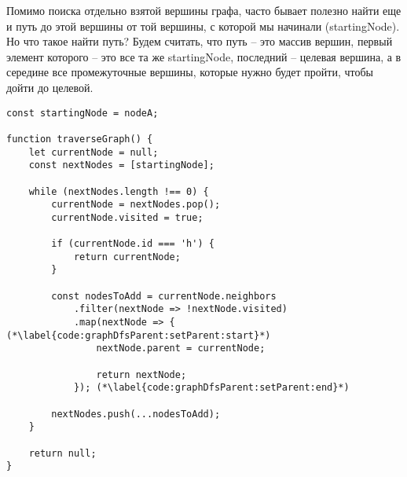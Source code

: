 \documentclass[../../article.tex]{subfiles}
\begin{document}
Помимо поиска отдельно взятой вершины графа, часто бывает полезно найти еще и путь до этой вершины от той вершины, с которой мы начинали ({\firacodebold startingNode}). Но что такое найти путь? Будем считать, что путь – это массив вершин, первый элемент которого – это все та же {\firacodebold startingNode}, последний – целевая вершина, а в середине все промежуточные вершины, которые нужно будет пройти, чтобы дойти до целевой.

\begin{figure*}
    \begin{ruledelement}
        \begin{lstlisting}[caption={Обход графа в глубину и формирование обратного дерева обхода}, label={lst:graphDfsParent}]
const startingNode = nodeA;

function traverseGraph() {
    let currentNode = null;
    const nextNodes = [startingNode];

    while (nextNodes.length !== 0) {
        currentNode = nextNodes.pop();
        currentNode.visited = true;

        if (currentNode.id === 'h') {
            return currentNode;
        }

        const nodesToAdd = currentNode.neighbors
            .filter(nextNode => !nextNode.visited)
            .map(nextNode => { (*\label{code:graphDfsParent:setParent:start}*)
                nextNode.parent = currentNode;

                return nextNode;
            }); (*\label{code:graphDfsParent:setParent:end}*)

        nextNodes.push(...nodesToAdd);
    }

    return null;
}
        \end{lstlisting}
    \end{ruledelement}

\end{figure*}
\end{document}
